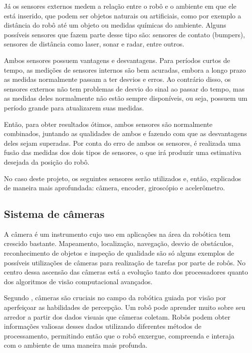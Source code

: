 \documentclass[acronym, symbols, table]{fei}
\begin{document}
			Já os sensores externos medem a relação entre o robô e o ambiente em que ele está inserido, que podem ser objetos naturais ou artificiais, como por exemplo a distância do robô até um objeto ou medidas químicas do ambiente. Alguns possíveis sensores que fazem parte desse tipo são: sensores de contato (bumpers), sensores de distância como laser, sonar e radar, entre outros.
			
			Ambos sensores possuem vantagens e desvantagens. Para períodos curtos de tempo, as medições de sensores internos são bem acuradas, embora a longo prazo as medidas normalmente passam a ter desvios e erros. Ao contrário disso, os sensores externos não tem problemas de desvio do sinal ao passar do tempo, mas as medidas deles normalmente não estão sempre disponíveis, ou seja, possuem um período grande para atualizarem suas medidas.
			
			Então, para obter resultados ótimos, ambos sensores são normalmente combinados, juntando as qualidades de ambos e fazendo com que as desvantagens deles sejam superadas. Por conta do erro de ambos os sensores, é realizada uma fusão das medidas dos dois tipos de sensores, o que irá produzir uma estimativa desejada da posição do robô.
			
			No caso deste projeto, os seguintes sensores serão utilizados e, então, explicados de maneira mais aprofundada: câmera, encoder, giroscópio e acelerômetro.
			
			\subsection{Sistema de câmeras} \label{sec:sensores_cameras}
			
				A câmera é um instrumento cujo uso em aplicações na área da robótica tem crescido bastante. Mapeamento, localização, navegação, desvio de obstáculos, reconhecimento de objetos e inspeção de qualidade são só alguns exemplos de possíveis utilizações de câmeras para realização de tarefas por parte de robôs. No centro dessa ascensão das câmeras está a evolução tanto dos processadores quanto dos algoritmos de visão computacional avançados.
				
				Segundo \textcite{cameras_technexion}, câmeras são cruciais no campo da robótica guiada por visão por aperfeiçoar as habilidades de percepção. Um robô pode aprender muito sobre seu arredor a partir dos dados visuais que câmeras coletam. Robôs podem obter informações valiosas desses dados utilizando diferentes métodos de processamento, permitindo então que o robô enxergue, compreenda e interaja com o ambiente de uma maneira mais profunda.
				
\end{document}
